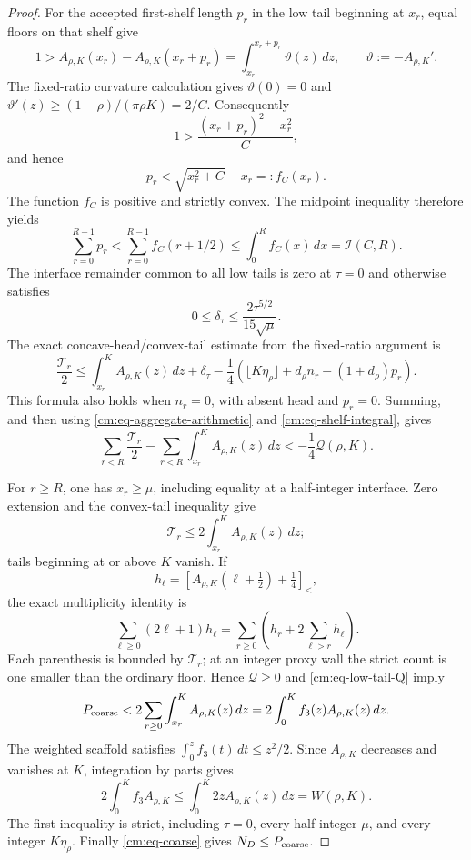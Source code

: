 \documentclass[11pt]{article}
\numberwithin{equation}{section}
\theoremstyle{definition}
\theoremstyle{remark}
\begin{document}
\begin{proof}
For the accepted first-shelf length \(p_r\) in the low tail beginning at
\(x_r\), equal floors on that shelf give
\[
 1>A_{\rho,K}(x_r)-A_{\rho,K}(x_r+p_r)
   =\int_{x_r}^{x_r+p_r}\vartheta(z)\,dz,
 \qquad \vartheta:=-A_{\rho,K}'.
\]
The fixed-ratio curvature calculation gives
\(\vartheta(0)=0\) and
\(\vartheta'(z)\geq(1-\rho)/(\pi\rho K)=2/C\).  Consequently
\[
 1>\frac{(x_r+p_r)^2-x_r^2}{C},
\]
and hence
\[
 p_r<\sqrt{x_r^2+C}-x_r=:f_C(x_r).
\]
The function \(f_C\) is positive and strictly convex.  The midpoint
inequality therefore yields
\begin{equation}
 \sum_{r=0}^{R-1}p_r
 <\sum_{r=0}^{R-1}f_C(r+1/2)
 \leq\int_0^Rf_C(x)\,dx=\mathcal I(C,R).
 \label{cm:eq-shelf-integral}
\end{equation}
The interface remainder common to all low tails is zero at \(\tau=0\) and
otherwise satisfies
\[
 0\leq\delta_\tau\leq
 \frac{2\tau^{5/2}}{15\sqrt\mu}.
\]
The exact concave-head/convex-tail estimate from the fixed-ratio argument is
\[
 \frac{\mathcal T_r}{2}
 \leq\int_{x_r}^KA_{\rho,K}(z)\,dz+\delta_\tau
 -\frac14\left(
 \lfloor K\eta_\rho\rfloor+d_\rho n_r-(1+d_\rho)p_r
 \right).
\]
This formula also holds when \(n_r=0\), with absent head and \(p_r=0\).
Summing, and then using \eqref{cm:eq-aggregate-arithmetic} and
\eqref{cm:eq-shelf-integral}, gives
\begin{equation}
 \sum_{r<R}\frac{\mathcal T_r}{2}
 -\sum_{r<R}\int_{x_r}^KA_{\rho,K}(z)\,dz
 <-\frac14\mathcal Q(\rho,K).
 \label{cm:eq-low-tail-Q}
\end{equation}

For \(r\geq R\), one has \(x_r\geq\mu\), including equality at a
half-integer interface.  Zero extension and the convex-tail inequality give
\[
 \mathcal T_r\leq2\int_{x_r}^KA_{\rho,K}(z)\,dz;
\]
tails beginning at or above \(K\) vanish.  If
\[
 h_\ell=
 \left[A_{\rho,K}(\ell+\tfrac12)+\tfrac14\right]_<,
\]
the exact multiplicity identity is
\[
 \sum_{\ell\geq0}(2\ell+1)h_\ell
 =\sum_{r\geq0}\left(h_r+2\sum_{\ell>r}h_\ell\right).
\]
Each parenthesis is bounded by \(\mathcal T_r\); at an integer proxy wall
the strict count is one smaller than the ordinary floor.  Hence
\(\mathcal Q\geq0\) and \eqref{cm:eq-low-tail-Q} imply
\[
 P_{\rm coarse}
 <2\sum_{r\geq0}\int_{x_r}^KA_{\rho,K}(z)\,dz
 =2\int_0^Kf_3(z)A_{\rho,K}(z)\,dz.
\]
The weighted scaffold satisfies
\(\int_0^zf_3(t)\,dt\leq z^2/2\).  Since \(A_{\rho,K}\) decreases and
vanishes at \(K\), integration by parts gives
\[
 2\int_0^Kf_3A_{\rho,K}
 \leq\int_0^K2zA_{\rho,K}(z)\,dz=W(\rho,K).
\]
The first inequality is strict, including \(\tau=0\), every half-integer
\(\mu\), and every integer \(K\eta_\rho\).  Finally
\eqref{cm:eq-coarse} gives \(N_D\leq P_{\rm coarse}\).
\end{proof}
\end{document}
